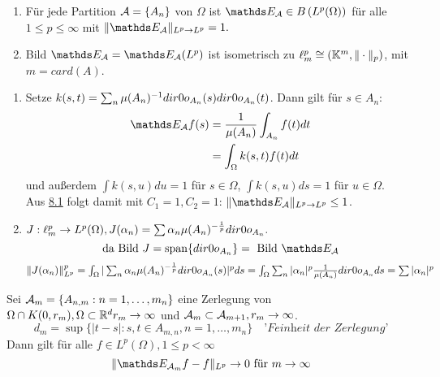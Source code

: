 \begin{kor}
	\begin{enumerate}[label=\alph*\upshape)]
		\item Für jede Partition $\mathcal{A} = \{ A_{n} \}$ von $\Omega$ ist $\EW_{\ca} \in B \left( L^{p}(\Omega) \right)$ für alle $1 \leq p \leq \infty$ mit $\| \EW_{\ca} \|_{L^{p} \rightarrow L^{p}} = 1.$
		\item Bild $\EW_{\ca} = \EW_{\ca}(L^{p})$ ist isometrisch zu $\ell^{p}_{m} \cong \left( \mathbb{K}^{m}, \| \cdot \|_{p} \right)$, mit $m = card(A)$.  
	\end{enumerate}
	\begin{beweis}	
		\begin{enumerate}[label=\alph*\upshape)]	
			\item Setze $k(s, t) = \sum_{n} \mu(A_{n})^{-1} \1_{A_{n}}(s) \1_{A_{n}}(t)$. Dann gilt für $s \in A_{n}$:
				\begin{align*}
					 \EW_{\ca} f(s) & = \frac{1}{\mu(A_{n})} \int_{A_{n}} f(t) dt \\
					 & = \int_{\Omega} k(s, t) f(t) dt
				\end{align*}
				und au{\ss}erdem $\int k(s, u) du = 1$ für $s \in \Omega$, $\int k(s, u) ds = 1$ für $u \in \Omega$. \\
				Aus \hyperref[satz:8.1]{8.1} folgt damit mit $C_{1} = 1, C_{2} = 1$: $\| \EW_{\ca} \|_{L^{p} \rightarrow L^{p}} \leq 1$.
			\item $J: \ell_{m}^{p} \rightarrow L^{p}(\Omega), J(\alpha_{n}) = \sum \alpha_{n} \mu(A_{n})^{- \frac{1}{p}} \1_{A_{n}}.$ \\
				\[ \text{da Bild } J = \text{span} \{ \1_{A_{n}} \} = \text{ Bild } \EW_{\ca} \]
				$\| J ( \alpha_{n}) \|_{L^{p}}^{p} = \int_{\Omega} | \sum_{n} \alpha_{n} \mu(A_{n})^{- \frac{1}{p}} \1_{A_{n}}(s) |^{p} ds = \int_{\Omega} \sum_{n} | \alpha_{n} |^{p} \frac{1}{\mu(A_{n})} \1_{A_{n}} ds = \sum |\alpha_{n}|^{p}$
		\end{enumerate}
	\end{beweis}
\end{kor}


\begin{satz} 
	Sei $\mathcal{A}_{m} = \{ A_{n, m} : n = 1, \dotsc, m_{n} \}$ eine Zerlegung von $ \Omega \cap K(0, r_{m}), \Omega \subset \mathbb{R}^{d} r_{m} \rightarrow \infty$ und $\mathcal{A}_{m} \subset \mathcal{A}_{m + 1}, r_{m} \rightarrow \infty$.
	\[ d_{m} = \sup \{ |t - s|: s, t \in A_{m, n}, n = 1, \dotsc, m_{n} \} \quad \textit{'Feinheit der Zerlegung'} \]
	Dann gilt für alle $f \in L^{p}(\Omega), 1 \leq p < \infty$
	\[ \| \EW_{\ca_{m}} f - f \|_{L^{p}} \rightarrow 0 \text{ für } m \rightarrow \infty \]
\end{satz}

